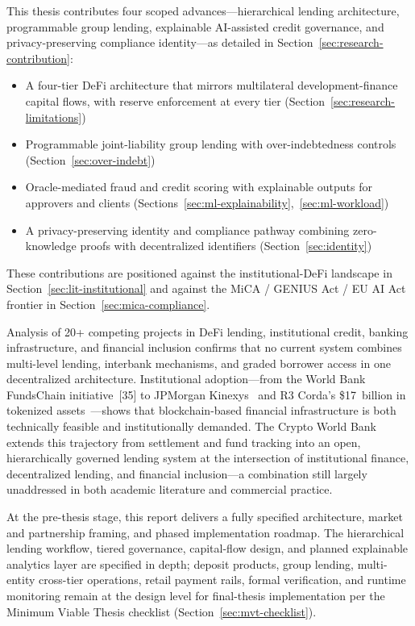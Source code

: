 \documentclass[12pt, a4paper]{report}
\begin{document}
This thesis contributes four scoped advances---hierarchical lending architecture, programmable group lending, explainable AI-assisted credit governance, and privacy-preserving compliance identity---as detailed in Section~\ref{sec:research-contribution}:
\begin{itemize}[noitemsep]
\item A four-tier DeFi architecture that mirrors multilateral development-finance capital flows, with reserve enforcement at every tier (Section~\ref{sec:research-limitations})
\item Programmable joint-liability group lending with over-indebtedness controls (Section~\ref{sec:over-indebt})
\item Oracle-mediated fraud and credit scoring with explainable outputs for approvers and clients (Sections~\ref{sec:ml-explainability},~\ref{sec:ml-workload})
\item A privacy-preserving identity and compliance pathway combining zero-knowledge proofs with decentralized identifiers (Section~\ref{sec:identity})
\end{itemize}
These contributions are positioned against the institutional-DeFi landscape in Section~\ref{sec:lit-institutional} and against the MiCA / GENIUS Act / EU AI Act frontier in Section~\ref{sec:mica-compliance}.

Analysis of 20+ competing projects in DeFi lending, institutional credit, banking infrastructure, and financial inclusion confirms that no current system combines multi-level lending, interbank mechanisms, and graded borrower access in one decentralized architecture. Institutional adoption---from the World Bank FundsChain initiative~[35] to JPMorgan Kinexys~ and R3 Corda's \$17~billion in tokenized assets~---shows that blockchain-based financial infrastructure is both technically feasible and institutionally demanded. The Crypto World Bank extends this trajectory from settlement and fund tracking into an open, hierarchically governed lending system at the intersection of institutional finance, decentralized lending, and financial inclusion---a combination still largely unaddressed in both academic literature and commercial practice.

At the pre-thesis stage, this report delivers a fully specified architecture, market and partnership framing, and phased implementation roadmap. The hierarchical lending workflow, tiered governance, capital-flow design, and planned explainable analytics layer are specified in depth; deposit products, group lending, multi-entity cross-tier operations, retail payment rails, formal verification, and runtime monitoring remain at the design level for final-thesis implementation per the Minimum Viable Thesis checklist (Section~\ref{sec:mvt-checklist}).
\end{document}
